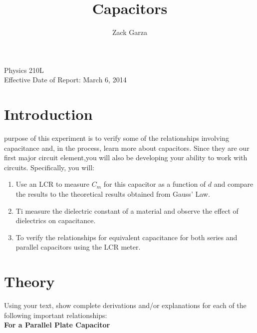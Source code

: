 \documentclass[twocolumn,english]{IEEEtran}
\theoremstyle{plain}
\theoremstyle{plain}
\begin{document}
\title{Capacitors}


\author{Zack Garza}


\IEEEspecialpapernotice
{Physics 210L \\
Effective Date of Report: March 6, 2014}


\maketitle

\tableofcontents

\section{Introduction}
 purpose of this experiment is to verify some of the relationships involving capacitance and, in the process, learn more about capacitors. Since they are our first major circuit element,you will also be developing your ability to work with circuits. Specifically, you will:
\begin{enumerate}
\item Use an LCR to measure $C_m$ for this capacitor as a function of $d$ and compare the results to the theoretical results obtained from Gauss' Law.
\item Ti measure the dielectric constant of a material and observe the effect of dielectrics on capacitance.
\item To verify the relationships for equivalent capacitance for both series and parallel capacitors using the LCR meter.
\end{enumerate}

\section{Theory}
Using your text, show complete derivations and/or explanations for each of the following important relationships: \\

\noindent\textbf{For a Parallel Plate Capacitor}
\end{document}
